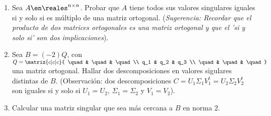 \begin{enunciado}{\ejExtra}
  \begin{enumerate}[label=\alph*)]
    \item
          Sea $A \en \reales^{n \times n}$. Probar que $A$ tiene todos sus valores singulares iguales si y solo si
          es múltiplo de una matriz ortogonal.
          (\textit{Sugerencia: Recordar que el producto de dos matrices ortogonales es una matriz ortogonal y que el 'si y solo si' son dos implicaciones}).

    \item Sea $B = (-2)Q$, con
          $Q =
            \matriz{c|c|c}{
              \quad& \quad& \quad\\
              q_1 & q_2 & q_3 \\
              \quad& \quad& \quad
            }$ una matriz ortogonal. Hallar dos descomposiciones en valores sigulares distintas de $B$.
          (Observación: dos descomposiciones
          $C =
            U_1 \Sigma_1 V_1^t =
            U_2 \Sigma_2 V_2^t
          $ son iguales si y solo si
          $U_1 = U_2$, $\Sigma_1 = \Sigma_2 $ y $ V_1 = V_2$).

    \item Calcular una matriz singular que sea más cercana a $B$ en norma 2.
  \end{enumerate}
\end{enunciado}

